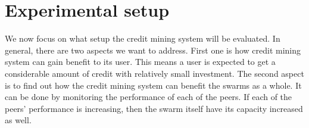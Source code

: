 \section{Experimental setup}
\label{section:cmexp}
We now focus on what setup the credit mining system will be evaluated. In general, there are two aspects we want to address. First one is how credit mining system can gain benefit to its user. This means a user is expected to get a considerable amount of credit with relatively small investment. The second aspect is to find out how the credit mining system can benefit the swarms as a whole. It can be done by monitoring the performance of each of the peers. If each of the peers' performance is increasing, then the swarm itself have its capacity increased as well.


